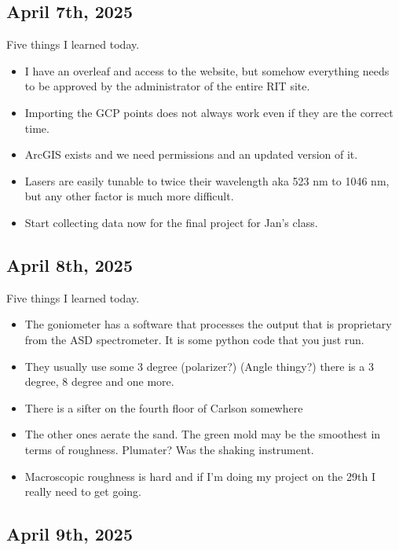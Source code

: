 \documentclass{article}
\begin{document}
\subsection{April 7th, 2025}

Five things I learned today. 

\begin{itemize}
    \item I have an overleaf and access to the website, but somehow everything needs to be approved by the administrator of the entire RIT site. 
    \item Importing the GCP points does not always work even if they are the correct time. 
    \item ArcGIS exists and we need permissions and an updated version of it. 
    \item Lasers are easily tunable to twice their wavelength aka 523 nm to 1046 nm, but any other factor is much more difficult. 
    \item Start collecting data now for the final project for Jan's class. 
\end{itemize}

\subsection{April 8th, 2025}
Five things I learned today. 

\begin{itemize}
    \item The goniometer has a software that processes the output that is proprietary from the ASD spectrometer. It is some python code that you just run. 
    \item They usually use some 3 degree (polarizer?) (Angle thingy?) there is a 3 degree, 8 degree and one more. 
    \item There is a sifter on the fourth floor of Carlson somewhere
    \item The other ones aerate the sand. The green mold may be the smoothest in terms of roughness. Plumater? Was the shaking instrument. 
    \item Macroscopic roughness is hard and if I'm doing my project on the 29th I really need to get going. 
\end{itemize}

\subsection{April 9th, 2025}
\end{document}
